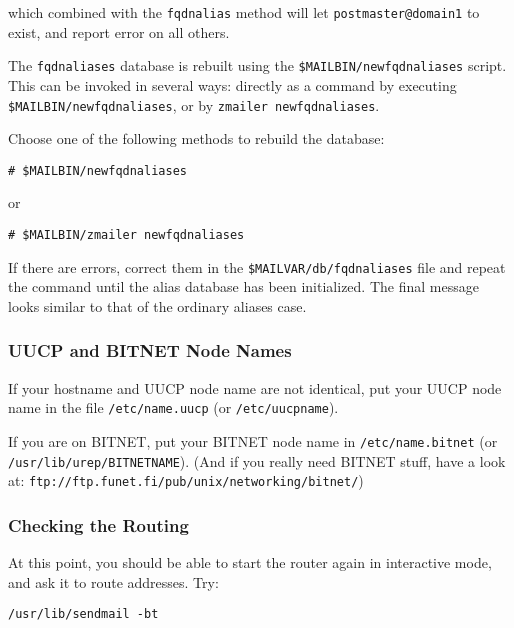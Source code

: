 \begin{itemize}
which combined with the {\tt fqdnalias} method will let {\tt postmaster@domain1}
to exist, and report error on all others.

The {\tt fqdnaliases} database is rebuilt using the {\tt \$MAILBIN/newfqdnaliases}
script.  This can be invoked in several ways: directly as a command
by executing {\tt \$MAILBIN/newfqdnaliases}, or by {\tt zmailer newfqdnaliases}.

Choose one of the following methods to rebuild the database:
\begin{tscreen}
\begin{verbatim}
# $MAILBIN/newfqdnaliases
\end{verbatim}
\end{tscreen}

or
\begin{tscreen}
\begin{verbatim}
# $MAILBIN/zmailer newfqdnaliases
\end{verbatim}
\end{tscreen}


If there are errors, correct them in the {\tt \$MAILVAR/db/fqdnaliases} file
and repeat the command until the alias database has been initialized.
The final message looks similar to that of the ordinary aliases case.
\end{itemize}





\subsubsection{UUCP and BITNET Node Names}

If your hostname and UUCP node name are not identical, put your
UUCP node name in the file {\tt /etc/name.uucp} (or {\tt /etc/uucpname}).

If you are on BITNET, put your BITNET node name in {\tt /etc/name.bitnet}
(or {\tt /usr/lib/urep/BITNETNAME}). (And if you really need BITNET stuff, have a look at:
{\tt ftp://ftp.funet.fi/pub/unix/networking/bitnet/})




\subsubsection{Checking the Routing}

At this point, you should be able to start the router again in
interactive mode, and ask it to route addresses.  Try:
\begin{tscreen}
\begin{verbatim}
/usr/lib/sendmail -bt
\end{verbatim}
\end{tscreen}

